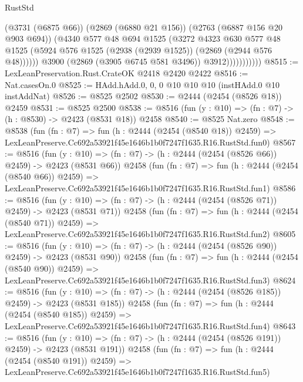 \begin{lexlean}{RustStd}
\begin{coremodule}
                            (@3731 (@6875 @66))
                            (@2869 (@6880 @21 @156))
                            (@2763 (@6887 @156 @20 @903 @694))
                            (@4340
                              @577
                              @48
                              @694
                              @1525
                              (@3272
                                @4323
                                @630
                                @577
                                @48
                                @1525
                                (@5924 @576 @1525 (@2938 (@2939 @1525)) (@2869 (@2944 @576 @48))))))
                          @3900
                          (@2869 (@3905 @6745 @581 @3496))
                          @3912)))))))))))
@8515 := LexLeanPreservation.Rust.CrateOK @2418 @2420 @2422
@8516 := Nat.casesOn.{0}
@8525 := HAdd.hAdd.{0, 0, 0} @10 @10 @10 (instHAdd.{0} @10 instAddNat)
@8526 := @8525 @2502
@8530 := @2444 (@2454 (@8526 @18)) @2459
@8531 := @8525 @2500
@8538 := @8516 (fun (y : @10) => (fn : @7) -> (h : @8530) -> @2423 (@8531 @18)) @2458
@8540 := @8525 Nat.zero
@8548 := @8538
    (fun (fn : @7) =>
    fun (h : @2444 (@2454 (@8540 @18)) @2459) =>
    LexLeanPreserve.Cc692a53921f45e1646b1b0f7247f1635.R16.RustStd.fun0)
@8567 := @8516
    (fun (y : @10) => (fn : @7) -> (h : @2444 (@2454 (@8526 @66)) @2459) -> @2423 (@8531 @66))
    @2458
    (fun (fn : @7) =>
    fun (h : @2444 (@2454 (@8540 @66)) @2459) =>
    LexLeanPreserve.Cc692a53921f45e1646b1b0f7247f1635.R16.RustStd.fun1)
@8586 := @8516
    (fun (y : @10) => (fn : @7) -> (h : @2444 (@2454 (@8526 @71)) @2459) -> @2423 (@8531 @71))
    @2458
    (fun (fn : @7) =>
    fun (h : @2444 (@2454 (@8540 @71)) @2459) =>
    LexLeanPreserve.Cc692a53921f45e1646b1b0f7247f1635.R16.RustStd.fun2)
@8605 := @8516
    (fun (y : @10) => (fn : @7) -> (h : @2444 (@2454 (@8526 @90)) @2459) -> @2423 (@8531 @90))
    @2458
    (fun (fn : @7) =>
    fun (h : @2444 (@2454 (@8540 @90)) @2459) =>
    LexLeanPreserve.Cc692a53921f45e1646b1b0f7247f1635.R16.RustStd.fun3)
@8624 := @8516
    (fun (y : @10) => (fn : @7) -> (h : @2444 (@2454 (@8526 @185)) @2459) -> @2423 (@8531 @185))
    @2458
    (fun (fn : @7) =>
    fun (h : @2444 (@2454 (@8540 @185)) @2459) =>
    LexLeanPreserve.Cc692a53921f45e1646b1b0f7247f1635.R16.RustStd.fun4)
@8643 := @8516
    (fun (y : @10) => (fn : @7) -> (h : @2444 (@2454 (@8526 @191)) @2459) -> @2423 (@8531 @191))
    @2458
    (fun (fn : @7) =>
    fun (h : @2444 (@2454 (@8540 @191)) @2459) =>
    LexLeanPreserve.Cc692a53921f45e1646b1b0f7247f1635.R16.RustStd.fun5)

\end{coremodule}
\end{lexlean}

